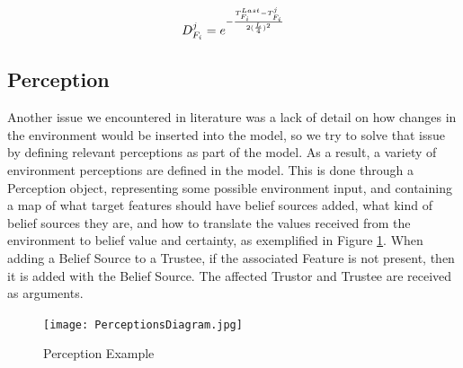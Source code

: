 \begin{equation}
    D^j_{F_i} = e^{-\frac{T^{Last}_{F_i} - T^j_{F_i}}{2(\frac{L}{4})^2}}
\label{eq:TimeValue}
\end{equation}


% 

\subsection{Perception}
Another issue we encountered in literature was a lack of detail on how changes in the environment would be inserted into the model, so we try to solve that issue by defining relevant perceptions as part of the model. As a result, a variety of environment perceptions are defined in the model. This is done through a Perception object, representing some possible environment input, and containing a map of what target features should have belief sources added, what kind of belief sources they are, and how to translate the values received from the environment to belief value and certainty, as exemplified in Figure \ref{fig:Perceptions Diagram}. When adding a Belief Source to a Trustee, if the associated Feature is not present, then it is added with the Belief Source. The affected Trustor and Trustee are received as arguments.

\begin{figure}[hbt]
    \centering
    \texttt{[image: PerceptionsDiagram.jpg]}
    \caption{Perception Example}
    \label{fig:Perceptions Diagram}
\end{figure}

